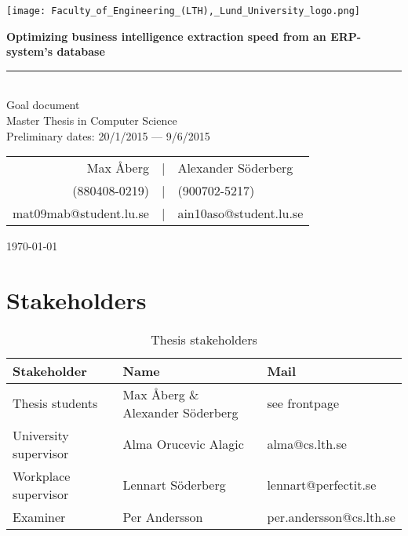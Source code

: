 \documentclass[12pt,a4paper]{article}
\newcommand{\HRule}{\rule{\linewidth}{0.5mm}}
\begin{document}
	\begin{titlepage}
  	\vspace*{3\baselineskip}
    \begin{center}
    	\begin{center}
    \texttt{[image: Faculty\_of\_Engineering\_(LTH),\_Lund\_University\_logo.png]}
    	\end{center}
    \vspace*{3\baselineskip}
    \large
    \bfseries
   \Huge
   Optimizing business intelligence extraction speed from an ERP-system's database
   \HRule\\
       \normalfont
          \LARGE
          Goal document \\
            \normalsize
            \vspace*{1\baselineskip}
      Master Thesis in  Computer Science\\
      \vspace*{4\baselineskip}
      Preliminary dates: 20/1/2015 --- 9/6/2015\\
      \vspace*{6\baselineskip}
      
      
      \begin{table}[H]
      \centering
      \begin{tabular}{r c l}
      Max Åberg &|& Alexander Söderberg\\
      (880408-0219) &|& (900702-5217) \\
      mat09mab@student.lu.se &|& ain10aso@student.lu.se\\
      \end{tabular}
      \end{table}

    
    

    \today \\

    \end{center}
\end{titlepage}
    
\newpage

\vspace*{-2\baselineskip}

\section*{Stakeholders}
\begin{table}[H]
    \begin{tabular}{l|l|l}
    Stakeholder & Name & Mail \\\hline
    Thesis students & Max Åberg \& Alexander Söderberg & see frontpage \\\hline
    University supervisor & Alma Orucevic Alagic & alma@cs.lth.se\\\hline
    Workplace supervisor & Lennart Söderberg & lennart@perfectit.se\\\hline
    Examiner & Per Andersson & per.andersson@cs.lth.se 
    \end{tabular}
    \caption{Thesis stakeholders}
\end{table}
\end{document}
